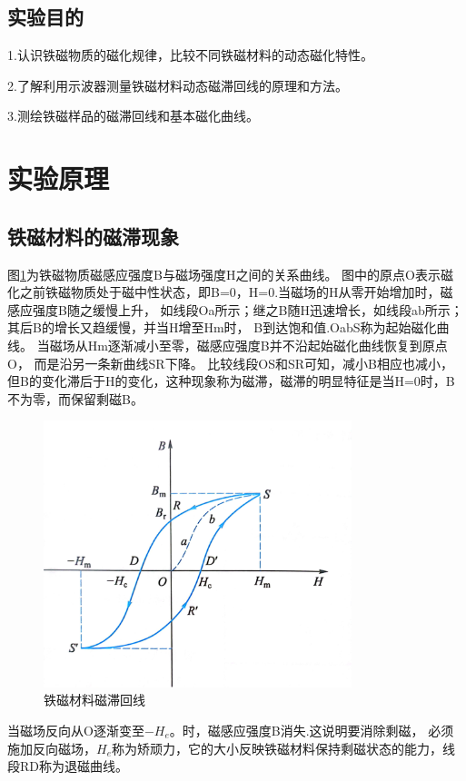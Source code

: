 \documentclass{ctexart}
\begin{document}
  \subsection{实验目的}
  1.\quad 认识铁磁物质的磁化规律，比较不同铁磁材料的动态磁化特性。

  2.\quad 了解利用示波器测量铁磁材料动态磁滞回线的原理和方法。
  
  3.\quad 测绘铁磁样品的磁滞回线和基本磁化曲线。

\section{实验原理}
  \subsection{铁磁材料的磁滞现象}
  图\ref{tieciqvxian}为铁磁物质磁感应强度B与磁场强度H之间的关系曲线。
  图中的原点O表示磁化之前铁磁物质处于磁中性状态，即B=0，H=0.当磁场的H从零开始增加时，磁感应强度B随之缓慢上升，
  如线段Oa所示；继之B随H迅速增长，如线段ab所示；其后B的增长又趋缓慢，并当H增至Hm时，
  B到达饱和值.OabS称为起始磁化曲线。
  当磁场从Hm逐渐减小至零，磁感应强度B并不沿起始磁化曲线恢复到原点O，
  而是沿另一条新曲线SR下降。
  比较线段OS和SR可知，减小B相应也减小，但B的变化滞后于H的变化，这种现象称为磁滞，磁滞的明显特征是当H=0时，B不为零，而保留剩磁B。

  \begin{figure}[H]\label{tieciqvxian}
    \centering
    \includegraphics[width=0.8\textwidth,height=0.4\textheight]{tieciqvxian.jpg}
    \caption{铁磁材料磁滞回线}
  \end{figure}

  当磁场反向从O逐渐变至$-H_{e}$。时，磁感应强度B消失.这说明要消除剩磁，
  必须施加反向磁场，$H_{e}$称为矫顽力，它的大小反映铁磁材料保持剩磁状态的能力，线段RD称为退磁曲线。
\end{document}

